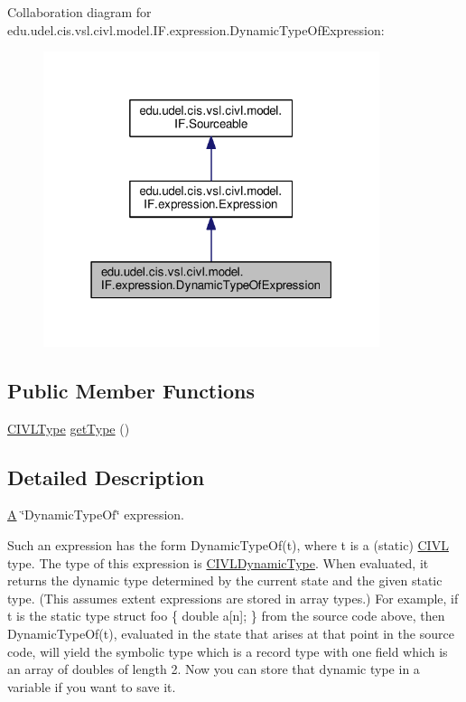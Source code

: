 Collaboration diagram for edu.\+udel.\+cis.\+vsl.\+civl.\+model.\+I\+F.\+expression.\+Dynamic\+Type\+Of\+Expression\+:
\nopagebreak
\begin{figure}[H]
\begin{center}
\leavevmode
\includegraphics[width=279pt]{interfaceedu_1_1udel_1_1cis_1_1vsl_1_1civl_1_1model_1_1IF_1_1expression_1_1DynamicTypeOfExpression__coll__graph}
\end{center}
\end{figure}
\subsection*{Public Member Functions}
\begin{DoxyCompactItemize}
\item 
\hyperlink{interfaceedu_1_1udel_1_1cis_1_1vsl_1_1civl_1_1model_1_1IF_1_1type_1_1CIVLType}{C\+I\+V\+L\+Type} \hyperlink{interfaceedu_1_1udel_1_1cis_1_1vsl_1_1civl_1_1model_1_1IF_1_1expression_1_1DynamicTypeOfExpression_a91fb8ae3285a807eca7211aa58f1f65a}{get\+Type} ()
\end{DoxyCompactItemize}


\subsection{Detailed Description}
\hyperlink{structA}{A} \char`\"{}\+Dynamic\+Type\+Of\char`\"{} expression. 

Such an expression has the form Dynamic\+Type\+Of(t), where t is a (static) \hyperlink{classedu_1_1udel_1_1cis_1_1vsl_1_1civl_1_1CIVL}{C\+I\+V\+L} type. The type of this expression is \hyperlink{}{C\+I\+V\+L\+Dynamic\+Type}. When evaluated, it returns the dynamic type determined by the current state and the given static type. (This assumes extent expressions are stored in array types.) For example, if {\ttfamily t} is the static type {\ttfamily struct foo \{ double a\mbox{[}n\mbox{]}; \}} from the source code above, then {\ttfamily Dynamic\+Type\+Of(t)}, evaluated in the state that arises at that point in the source code, will yield the symbolic type which is a record type with one field which is an array of doubles of length 2. Now you can store that dynamic type in a variable if you want to save it.

